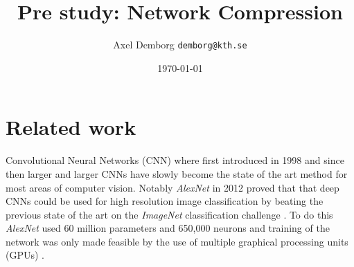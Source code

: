 \documentclass[11pt]{article}
\author{Axel Demborg \texttt{demborg@kth.se}}
\date{\today}
\title{Pre study: Network Compression}
\newcommand{\bibentry}[1]{\cite{#1}}
\begin{document}
\maketitle

\section*{Related work}
\label{sec:org5d088f8}
Convolutional Neural Networks (CNN) where first introduced in 1998 \bibentry{lecun1998gradient} and since then larger and larger CNNs have slowly become the state of the art method for most areas of computer vision. Notably \emph{AlexNet} \bibentry{krizhevsky2012imagenet} in 2012 proved that that deep CNNs could be used for high resolution image classification by beating the previous state of the art \bibentry{sanchez2011high} on the \emph{ImageNet} classification challenge \bibentry{deng2009imagenet}. To do this \emph{AlexNet} used 60 million parameters and 650,000 neurons and training of the network was only made feasible by the use of multiple graphical processing units (GPUs) \bibentry{krizhevsky2012imagenet}. 
\end{document}
